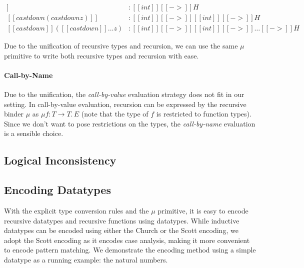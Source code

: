 \begin{align*}
[[castdown z]] &: [[int]][[->]]H  \\
[[castdown(castdown z)]] &: [[int]][[->]][[int]][[->]]H \\
[[castdown]]([[castdown]] \dots z) &: [[int]][[->]][[int]][[->]]\dots[[->]]H
\end{align*}

Due to the unification of recursive types and recursion, we can use
the same $\mu$ primitive to write both recursive types and recursion
with ease.

\paragraph{Call-by-Name}
Due to the unification, the \emph{call-by-value} evaluation strategy
does not fit in our setting. In call-by-value evaluation, recursion
can be expressed by the recursive binder $\mu$ as $\mu f : T
\rightarrow T.\, E$ (note that the type of $f$ is restricted to
function types). Since we don't want to pose restrictions on the
types, the \emph{call-by-name} evaluation is a sensible choice.

\subsection{Logical Inconsistency}

  

\subsection{Encoding Datatypes}


With the explicit type conversion rules and the $\mu$ primitive, it is
easy to encode recursive datatypes and recursive functions using
datatypes. While inductive datatypes can be encoded using either the
Church or the Scott encoding, we adopt the Scott encoding as it
encodes case analysis, making it more convenient to
encode pattern matching. We demonstrate the encoding method using a
simple datatype as a running example: the natural numbers.

